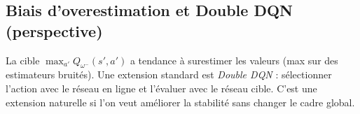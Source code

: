 \documentclass[11pt,a4paper]{report}
\theoremstyle{definition}
\theoremstyle{plain}
\theoremstyle{remark}
\newcommand{\1}{\mathbf{1}}
\newcommand{\codeid}[1]{\texttt{\detokenize{#1}}}
\begin{document}
\subsection*{Biais d'overestimation et Double DQN (perspective)}
La cible $\max_{a'}Q_{\omega^-}(s',a')$ a tendance à surestimer les valeurs (max sur des estimateurs bruités).
Une extension standard est \emph{Double DQN} : sélectionner l'action avec le réseau en ligne et l'évaluer avec le réseau cible.
C'est une extension naturelle si l'on veut améliorer la stabilité sans changer le cadre global.

\end{document}
